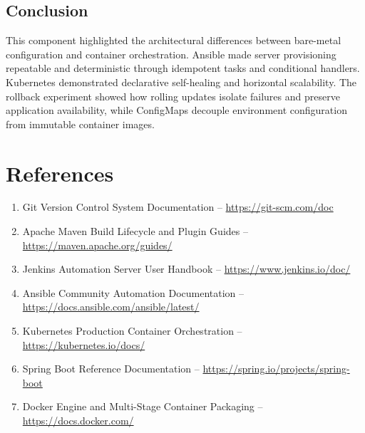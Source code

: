 \documentclass[12pt,a4paper]{article}
\begin{document}
\vspace{0.2cm}

\subsection*{Conclusion}
This component highlighted the architectural differences between bare-metal configuration and container orchestration. Ansible made server provisioning repeatable and deterministic through idempotent tasks and conditional handlers. Kubernetes demonstrated declarative self-healing and horizontal scalability. The rollback experiment showed how rolling updates isolate failures and preserve application availability, while ConfigMaps decouple environment configuration from immutable container images.

\newpage

\section*{References}

\begin{enumerate}[nosep]
    \item Git Version Control System Documentation -- \url{https://git-scm.com/doc}
    \item Apache Maven Build Lifecycle and Plugin Guides -- \url{https://maven.apache.org/guides/}
    \item Jenkins Automation Server User Handbook -- \url{https://www.jenkins.io/doc/}
    \item Ansible Community Automation Documentation -- \url{https://docs.ansible.com/ansible/latest/}
    \item Kubernetes Production Container Orchestration -- \url{https://kubernetes.io/docs/}
    \item Spring Boot Reference Documentation -- \url{https://spring.io/projects/spring-boot}
    \item Docker Engine and Multi-Stage Container Packaging -- \url{https://docs.docker.com/}
\end{enumerate}
\end{document}
